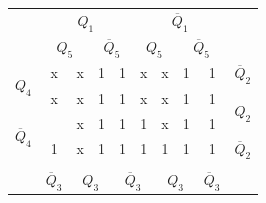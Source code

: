 \documentclass[a4paper,14pt]{article}
\begin{document}
\begin{table}[H]
\begin{minipage}{.5\linewidth}
\begin{tabular}{cccccccccc}
\end{tabular}
	\end{minipage}%
	\begin{minipage}{.5\linewidth}
		\centering
\begin{tabular}{cccccccccc}
	& \multicolumn{4}{c}{$Q_1$}                                                                         & \multicolumn{4}{c}{$\overline{Q}_1$}                                                              &                        \\
	& \multicolumn{2}{c}{$Q_5$}                       & \multicolumn{2}{c}{$\overline{Q}_5$}            & \multicolumn{2}{c}{$Q_5$}                       & \multicolumn{2}{c}{$\overline{Q}_5$}            &                        \\ \cline{2-9}
	\multicolumn{1}{c|}{\multirow{2}{*}{$Q_4$}}            & \multicolumn{1}{c|}{x} & \multicolumn{1}{c|}{x} & \multicolumn{1}{c|}{1} & \multicolumn{1}{c|}{1} & \multicolumn{1}{c|}{x} & \multicolumn{1}{c|}{x} & \multicolumn{1}{c|}{1} & \multicolumn{1}{c|}{1} & $\overline{Q}_2$       \\ \cline{2-9}
	\multicolumn{1}{c|}{}                                  & \multicolumn{1}{c|}{x} & \multicolumn{1}{c|}{x} & \multicolumn{1}{c|}{1} & \multicolumn{1}{c|}{1} & \multicolumn{1}{c|}{x} & \multicolumn{1}{c|}{x} & \multicolumn{1}{c|}{1} & \multicolumn{1}{c|}{1} & \multirow{2}{*}{$Q_2$} \\ \cline{2-9}
	\multicolumn{1}{c|}{\multirow{2}{*}{$\overline{Q}_4$}} & \multicolumn{1}{c|}{}  & \multicolumn{1}{c|}{x} & \multicolumn{1}{c|}{1} & \multicolumn{1}{c|}{1} & \multicolumn{1}{c|}{1} & \multicolumn{1}{c|}{x} & \multicolumn{1}{c|}{1} & \multicolumn{1}{c|}{1} &                        \\ \cline{2-9}
	\multicolumn{1}{c|}{}                                  & \multicolumn{1}{c|}{1} & \multicolumn{1}{c|}{x} & \multicolumn{1}{c|}{1} & \multicolumn{1}{c|}{1} & \multicolumn{1}{c|}{1} & \multicolumn{1}{c|}{1} & \multicolumn{1}{c|}{1} & \multicolumn{1}{c|}{1} & $\overline{Q}_2$       \\ \cline{2-9}
	&                        & \multicolumn{2}{c}{}                            & \multicolumn{2}{c}{}                            & \multicolumn{2}{c}{}                            &                        &                        \\
	& $\overline{Q}_3$       & \multicolumn{2}{c}{$Q_3$}                       & \multicolumn{2}{c}{$\overline{Q}_3$}            & \multicolumn{2}{c}{$Q_3$}                       & $\overline{Q}_3$       &                       
\end{tabular}
	\end{minipage} 
\end{table}
\end{document}
